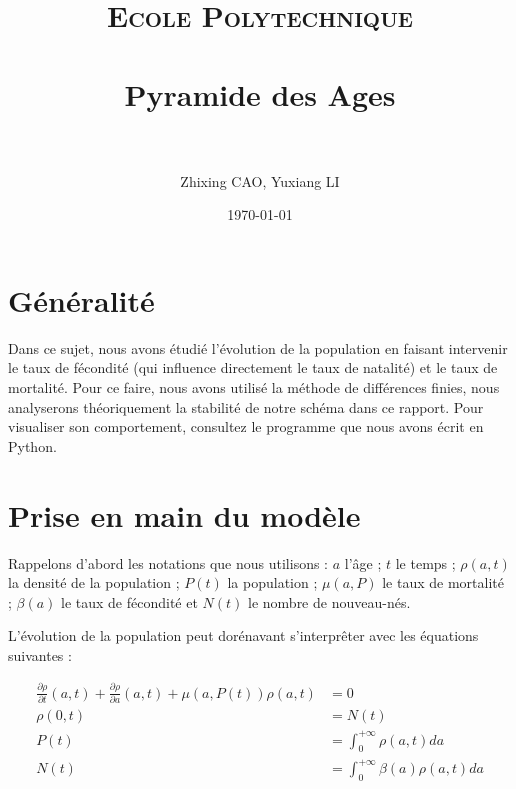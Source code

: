 \documentclass[paper=a4, french]{scrartcl} %
\title{	
\normalfont \normalsize 
\textsc{Ecole Polytechnique} \\ [25pt] %
\horrule{0.5pt} \\[0.4cm] %
\huge Pyramide des Ages \\ %
\horrule{2pt} \\[0.5cm] %
}
\author{Zhixing CAO, Yuxiang LI} %
\date{\normalsize\today} %
\numberwithin{equation}{section} %
\numberwithin{figure}{section} %
\numberwithin{table}{section} %
\begin{document}
\setlength\parindent{12pt}

\maketitle %



\section{Généralité}
Dans ce sujet, nous avons étudié l\rq{}évolution de la population en faisant intervenir le taux de fécondité (qui influence directement le taux de natalité) et le taux de mortalité. Pour ce faire, nous avons utilisé la méthode de différences finies, nous analyserons théoriquement la stabilité de notre schéma dans ce rapport. Pour visualiser son comportement, consultez le programme que nous avons écrit en Python.


\section{Prise en main du modèle}

Rappelons d\rq{}abord les notations que nous utilisons : $a$ l\rq{}âge ; $t$ le temps ; $\rho(a,t)$ la densité de la population ; $P(t)$ la population ; $\mu(a,P)$ le taux de mortalité ; $\beta(a)$ le taux de fécondité et $N(t)$ le nombre de nouveau-nés.

L\rq{}évolution de la population peut dorénavant s\rq{}interprêter avec les équations suivantes : 

\begin{align}
\frac{\partial \rho}{\partial t}(a,t) +  \frac{\partial \rho}{\partial a}(a,t) + \mu(a,P(t))\rho(a,t) & = 0 \label{eq:1}\\
\rho(0,t) & = N(t) \label{eq:2}\\
P(t) & = {\int_{0}^{+\infty}\rho(a,t)da} \label{eq:3}\\
N(t) & = \int_{0}^{+\infty}\beta(a)\rho(a,t)da \label{eq:4}
\end{align}
\end{document}
